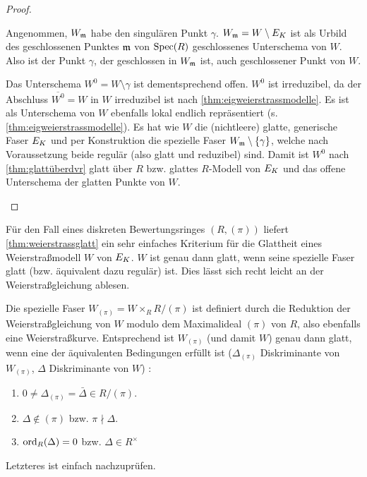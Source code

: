 \documentclass[german]{scrreprt}
\begin{document}
\begin{Lemma}
\begin{proof}
\begin{enumerate}[label=(\alph*)]
      Angenommen, $W_{\mathfrak{m}}$ habe den singulären Punkt
      $\gamma$.
      $W_{\mathfrak{m}}=W\setminus E_{K}$ ist als Urbild des geschlossenen Punktes
      $\mathfrak{m}$ von $\operatorname{Spec}(R)$ geschlossenes Unterschema von $W$.
      Also ist der Punkt $\gamma$, der geschlossen in $W_{\mathfrak{m}}$ ist, auch
      geschlossener Punkt von $W$.
      
      Das Unterschema $W^0=W\setminus\gamma$ ist dementsprechend offen.
      $W^0$ ist irreduzibel, da der Abschluss $\overline{W^0}=W$ in
      $W$ irreduzibel ist nach \autoref{thm:eigweierstrassmodelle}.
      Es ist als Unterschema von $W$ ebenfalls lokal endlich
      repräsentiert (s. \autoref{thm:eigweierstrassmodelle}).
      Es hat wie $W$ die (nichtleere) glatte, generische Faser $E_{K}$ und
      per Konstruktion die spezielle Faser $W_{\mathfrak{m}}\setminus\{\gamma\}$,
      welche nach Voraussetzung beide regulär (also glatt und reduzibel)
      sind.
      Damit ist $W^0$ nach \autoref{thm:glattüberdvr} glatt über $R$
      bzw. glattes $R$-Modell von $E_{K}$ und das offene Unterschema
      der glatten Punkte von $W$.
    \end{enumerate}
  \end{proof}
\end{Lemma}


\begin{Bemerkung}\label{thm:weierstraßmodellglatt}
  Für den Fall eines diskreten Bewertungsringes $(R,(\pi))$ liefert
  \autoref{thm:weierstrassglatt} ein sehr einfaches Kriterium für die
  Glattheit eines Weierstraßmodell $W$ von $E_{K}$.
  $W$ ist genau dann glatt, wenn seine spezielle Faser glatt
  (bzw. äquivalent dazu regulär) ist.
  Dies lässt sich recht leicht an der Weierstraßgleichung ablesen.
  
  Die spezielle Faser $W_{(\pi)}=W\times_R R/(\pi)$ ist definiert
  durch die Reduktion der Weierstraßgleichung von $W$ modulo dem
  Maximalideal $(\pi)$ von $R$, also ebenfalls eine Weierstraßkurve.
  Entsprechend ist $W_{(\pi)}$ (und damit $W$) genau dann glatt, wenn
  eine der äquivalenten Bedingungen erfüllt ist
  ($\Delta_{(\pi)}$ Diskriminante von $W_{(\pi)}$,
  $\Delta$ Diskriminante von $W$)
  \cite[Proposition VII.5.1 (a)]{silverman}:
  \begin{enumerate}[label=(\roman*)]
  \item $0\neq\Delta_{(\pi)}=\bar\Delta\in R/(\pi)$.
  \item $\Delta\not\in(\pi)$ bzw. $\pi\nmid\Delta$.
  \item $\operatorname{ord}_R(\Delta)=0$ bzw. $\Delta\in R^\times$
  \end{enumerate}
  Letzteres ist einfach nachzuprüfen.
\end{Bemerkung}
\end{document}
